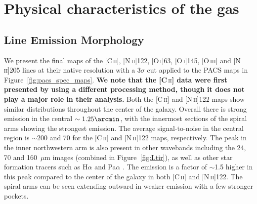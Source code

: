 \documentclass[preprint2]{aastex}
\begin{document}

\section{Physical characteristics of the gas}\label{gas_char}
\subsection{Line Emission Morphology}\label{morphology}
We present the final maps of the [C\,\textsc{ii}], [N\,\textsc{ii}]122, [O\,\textsc{i}]63, [O\,\textsc{i}]145, [O\,\textsc{iii}] and [N\,\textsc{ii}]205 lines at their native resolution with a 3$\sigma$ cut applied to the PACS maps in Figure~\ref{fig:pacs_spec_maps}.  \textbf{We note that the [C\,}\textsc{ii}\textbf{] data were first presented by \citet{2013arXiv1304.1801S} using a different processing method, though it does not play a major role in their analysis.} Both the [C\,\textsc{ii}] and [N\,\textsc{ii}]122 maps show similar distributions throughout the center of the galaxy.  Overall there is strong emission in the central $\sim1.25\arcmin$, with the innermost sections of the spiral arms showing the strongest emission.  The average signal-to-noise in the central region is $\sim200$ and 70 for the [C\,\textsc{ii}] and [N\,\textsc{ii}]122 maps, respectively.  The peak in the inner northwestern arm is also present in other wavebands including the 24, 70 and 160~$\mu$m images (combined in Figure~\ref{fig:Ltir}), as well as other star formation tracers such as H$\alpha$ and Pa$\alpha$ \citep[e.g.][]{2003PASP..115..928K,2005ApJ...633..871C}.   The emission is a factor of $\sim$1.5 higher in this peak compared to the center of the galaxy in both [C\,\textsc{ii}] and [N\,\textsc{ii}]122.  The spiral arms can be seen extending outward in weaker emission with a few stronger pockets.
\end{document}
